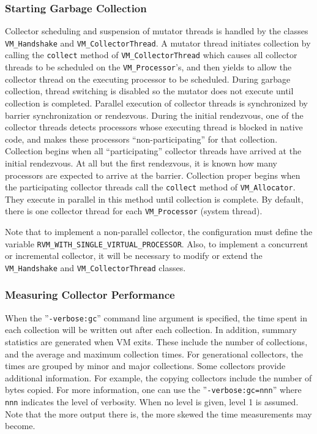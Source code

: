\subsubsection{Starting Garbage Collection}
Collector scheduling and suspension of mutator threads is
handled by the classes {\tt VM\_Handshake} and {\tt VM\_CollectorThread}.
A mutator thread initiates collection by calling the {\tt collect} method
of {\tt VM\_CollectorThread} which causes all collector threads to be scheduled
on the {\tt VM\_Processor}'s, and then yields to allow the collector thread
on the executing processor to be scheduled.  During garbage collection, thread
switching is disabled so the mutator does not execute until collection is completed.
Parallel execution of collector threads is synchronized by barrier synchronization or
rendezvous.  During the initial rendezvous, one of the collector threads detects
processors whose executing thread is blocked in native code, and makes
these processors ``non-participating'' for that collection.
Collection begins when all ``participating'' collector threads
have arrived at the initial rendezvous.  At all but the first rendezvous,
it is known how many processors are expected to arrive at the barrier.
Collection proper begins when the participating collector threads
call the {\tt collect} method of {\tt VM\_Allocator}.  They execute
in parallel in this method until collection is complete.  By default,
there is one collector thread for each {\tt VM\_Processor} (system thread).

Note that to implement a non-parallel collector, 
the configuration must define the variable {\tt RVM\_WITH\_SINGLE\_VIRTUAL\_PROCESSOR}.
Also, to implement a concurrent or incremental collector,
it will be necessary to modify or extend the {\tt VM\_Handshake} and {\tt VM\_CollectorThread} classes.

\subsubsection{Measuring Collector Performance}
When the ''{\tt -verbose:gc}'' command line argument is specified, the time
spent in each collection will be written out after each collection.
In addition, summary statistics are generated when VM exits.  These include
the number of collections, and the average and maximum collection times.
For generational collectors, the times are grouped by minor and major collections.
Some collectors provide additional information.  For example,
the copying collectors include the number of bytes copied.
For more information, one can use the ''{\tt -verbose:gc=nnn}'' where {\tt nnn} indicates the level of 
verbosity.  When no level is given, level 1 is assumed.
Note that the more output there is, the more skewed the time measurements may become.

